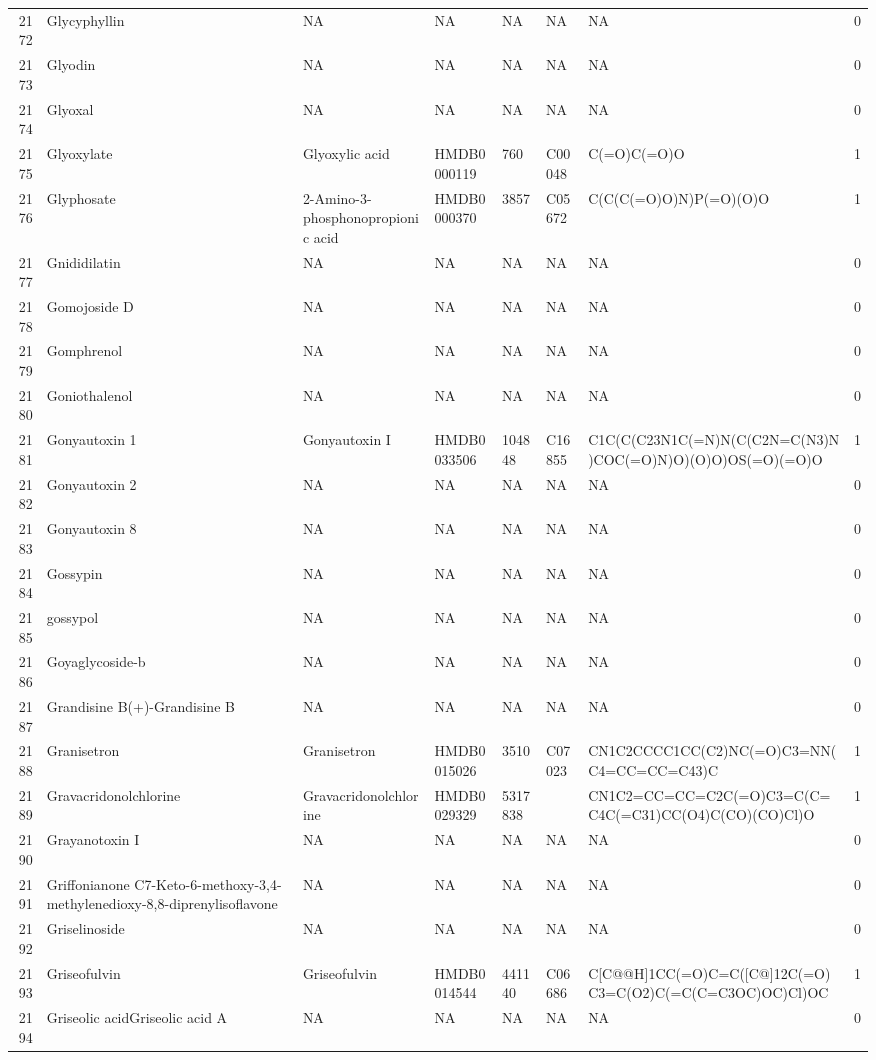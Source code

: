 \documentclass[a4paper]{article}
\begin{document}
\begin{longtable}{rlllllll}
  2172 & Glycyphyllin & NA & NA & NA & NA & NA & 0 \\ 
  2173 & Glyodin & NA & NA & NA & NA & NA & 0 \\ 
  2174 & Glyoxal & NA & NA & NA & NA & NA & 0 \\ 
  2175 & Glyoxylate & Glyoxylic acid & HMDB0000119 & 760 & C00048 & C(=O)C(=O)O & 1 \\ 
  2176 & Glyphosate & 2-Amino-3-phosphonopropionic acid & HMDB0000370 & 3857 & C05672 & C(C(C(=O)O)N)P(=O)(O)O & 1 \\ 
  2177 & Gnididilatin & NA & NA & NA & NA & NA & 0 \\ 
  2178 & Gomojoside D & NA & NA & NA & NA & NA & 0 \\ 
  2179 & Gomphrenol & NA & NA & NA & NA & NA & 0 \\ 
  2180 & Goniothalenol & NA & NA & NA & NA & NA & 0 \\ 
  2181 & Gonyautoxin 1 & Gonyautoxin I & HMDB0033506 & 104848 & C16855 & C1C(C(C23N1C(=N)N(C(C2N=C(N3)N)COC(=O)N)O)(O)O)OS(=O)(=O)O & 1 \\ 
  2182 & Gonyautoxin 2 & NA & NA & NA & NA & NA & 0 \\ 
  2183 & Gonyautoxin 8 & NA & NA & NA & NA & NA & 0 \\ 
  2184 & Gossypin & NA & NA & NA & NA & NA & 0 \\ 
  2185 & gossypol & NA & NA & NA & NA & NA & 0 \\ 
  2186 & Goyaglycoside-b & NA & NA & NA & NA & NA & 0 \\ 
  2187 & Grandisine B(+)-Grandisine B & NA & NA & NA & NA & NA & 0 \\ 
  2188 & Granisetron & Granisetron & HMDB0015026 & 3510 & C07023 & CN1C2CCCC1CC(C2)NC(=O)C3=NN(C4=CC=CC=C43)C & 1 \\ 
  2189 & Gravacridonolchlorine & Gravacridonolchlorine & HMDB0029329 & 5317838 &  & CN1C2=CC=CC=C2C(=O)C3=C(C=C4C(=C31)CC(O4)C(CO)(CO)Cl)O & 1 \\ 
  2190 & Grayanotoxin I & NA & NA & NA & NA & NA & 0 \\ 
  2191 & Griffonianone C7-Keto-6-methoxy-3,4-methylenedioxy-8,8-diprenylisoflavone & NA & NA & NA & NA & NA & 0 \\ 
  2192 & Griselinoside & NA & NA & NA & NA & NA & 0 \\ 
  2193 & Griseofulvin & Griseofulvin & HMDB0014544 & 441140 & C06686 & C[C@@H]1CC(=O)C=C([C@]12C(=O)C3=C(O2)C(=C(C=C3OC)OC)Cl)OC & 1 \\ 
  2194 & Griseolic acidGriseolic acid A & NA & NA & NA & NA & NA & 0 \\ 

\end{longtable}
\end{document}
